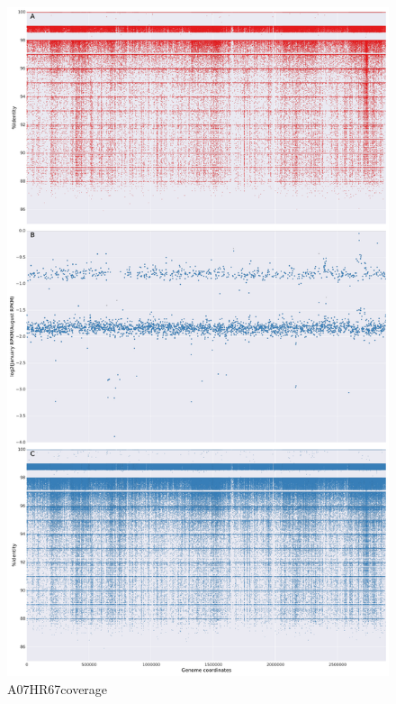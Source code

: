 \begin{figure}[!hbtp]
  \centering
  \includegraphics[width=\textwidth,height=\textheight,keepaspectratio]{Chapter5/Figures/coverage_plots/A07HR67_coverage.pdf}
  \caption{A07HR67coverage}
  \label{A07HR67coverage}
\end{figure}

